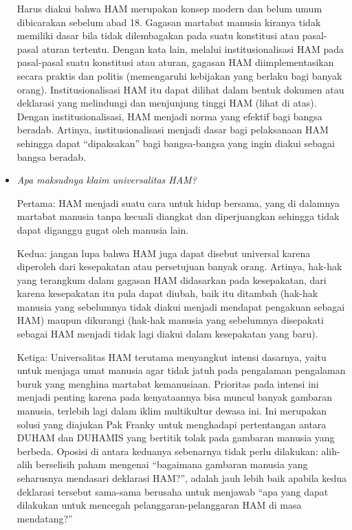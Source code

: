 \documentclass[10pt,a4paper]{article}
\begin{document}
\begin{multicols}{2}
\begin{itemize}
  Harus diakui bahwa HAM merupakan konsep modern dan belum umum
  dibicarakan sebelum abad 18. Gagasan martabat manusia kiranya tidak
  memiliki dasar bila tidak dilembagakan pada suatu konstitusi atau
  pasal-pasal aturan tertentu. Dengan kata lain, melalui
  institusionalisasi HAM pada pasal-pasal suatu konstitusi atau aturan,
  gagasan HAM diimplementasikan secara praktis dan politis (memengaruhi
  kebijakan yang berlaku bagi banyak orang). Institusionalisasi HAM itu
  dapat dilihat dalam bentuk dokumen atau deklarasi yang melindungi dan
  menjunjung tinggi HAM (lihat di atas). Dengan institusionalisasi, HAM
  menjadi norma yang efektif bagi bangsa beradab. Artinya,
  institusionalisasi menjadi dasar bagi pelaksanaan HAM sehingga dapat
  ``dipaksakan'' bagi bangsa-bangsa yang ingin diakui sebagai bangsa
  beradab.
\item
  \emph{Apa maksudnya klaim universalitas HAM?}

  Pertama: HAM menjadi suatu cara untuk hidup bersama, yang di dalamnya
  martabat manusia tanpa kecuali diangkat dan diperjuangkan sehingga
  tidak dapat diganggu gugat oleh manusia lain.

  Kedua: jangan lupa bahwa HAM juga dapat disebut universal karena
  diperoleh dari kesepakatan atau persetujuan banyak orang. Artinya,
  hak-hak yang terangkum dalam gagasan HAM didasarkan pada kesepakatan,
  dari karena kesepakatan itu pula dapat diubah, baik itu ditambah
  (hak-hak manusia yang sebelumnya tidak diakui menjadi mendapat
  pengakuan sebagai HAM) maupun dikurangi (hak-hak manusia yang
  sebelumnya disepakati sebagai HAM menjadi tidak lagi diakui dalam
  kesepakatan yang baru).

  Ketiga: Universalitas HAM terutama menyangkut intensi dasarnya, yaitu
  untuk menjaga umat manusia agar tidak jatuh pada pengalaman pengalaman
  buruk yang menghina martabat kemanusiaan. Prioritas pada intensi ini
  menjadi penting karena pada kenyataannya bisa muncul banyak gambaran
  manusia, terlebih lagi dalam iklim multikultur dewasa ini. Ini
  merupakan solusi yang diajukan Pak Franky untuk menghadapi
  pertentangan antara DUHAM dan DUHAMIS yang bertitik tolak pada
  gambaran manusia yang berbeda. Oposisi di antara keduanya sebenarnya
  tidak perlu dilakukan: alih-alih berselisih paham mengenai ``bagaimana
  gambaran manusia yang seharusnya mendasari deklarasi HAM?'', adalah
  jauh lebih baik apabila kedua deklarasi tersebut sama-sama berusaha
  untuk menjawab ``apa yang dapat dilakukan untuk mencegah
  pelanggaran-pelanggaran HAM di masa mendatang?''
\end{itemize}


\end{multicols}
\end{document}
